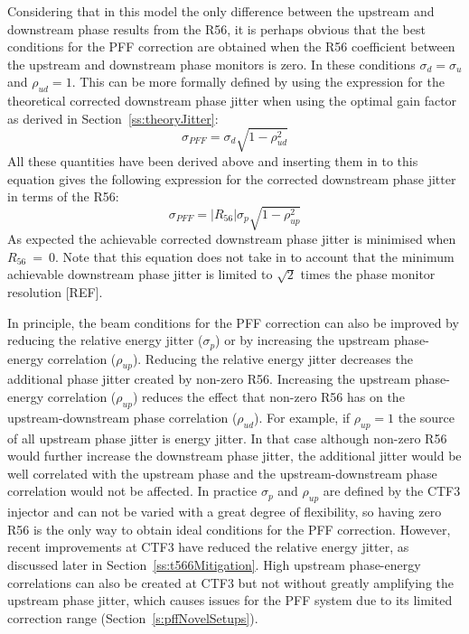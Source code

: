 Considering that in this model the only difference between the upstream and downstream phase results from the R56, it is perhaps obvious that the best conditions for the PFF correction are obtained when the R56 coefficient between the upstream and downstream phase monitors is zero. In these conditions \(\sigma_d = \sigma_u\) and \(\rho_{ud} = 1\). This can be more formally defined by using the expression for the theoretical corrected downstream phase jitter when using the optimal gain factor as derived in Section~\ref{ss:theoryJitter}:
\begin{equation}
\sigma_{PFF} = \sigma_d\sqrt{1-\rho_{ud}^2}
\end{equation}
All these quantities have been derived above and inserting them in to this equation gives the following expression for the corrected downstream phase jitter in terms of the R56:
\begin{equation}
\sigma_{PFF} = \left|R_{56}\right|\sigma_p\sqrt{1-\rho_{up}^2}
\label{e:r56PFFJit}
\end{equation}
As expected the achievable corrected downstream phase jitter is minimised when \(R_{56}~=~0\). Note that this equation does not take in to account that the minimum achievable downstream phase jitter is limited to \(\sqrt{2}\) times the phase monitor resolution [REF].

In principle, the beam conditions for the PFF correction can also be improved by reducing the relative energy jitter (\(\sigma_p\)) or by increasing the upstream phase-energy correlation (\(\rho_{up}\)). Reducing the relative energy jitter decreases the additional phase jitter created by non-zero R56. Increasing the upstream phase-energy correlation (\(\rho_{up}\)) reduces the effect that non-zero R56 has on the upstream-downstream phase correlation (\(\rho_{ud}\)). For example, if \(\rho_{up}=1\) the source of all upstream phase jitter is energy jitter. In that case although non-zero R56 would further increase the downstream phase jitter, the additional jitter would be well correlated with the upstream phase and the upstream-downstream phase correlation would not be affected. In practice \(\sigma_p\) and \(\rho_{up}\) are defined by the CTF3 injector and can not be varied with a great degree of flexibility, so having zero R56 is the only way to obtain ideal conditions for the PFF correction. However, recent improvements at CTF3 have reduced the relative energy jitter, as discussed later in Section~\ref{ss:t566Mitigation}. High upstream phase-energy correlations can also be created at CTF3 but not without greatly amplifying the upstream phase jitter, which causes issues for the PFF system due to its limited correction range (Section~\ref{s:pffNovelSetups}).

